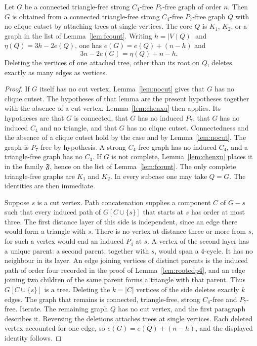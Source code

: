 \documentclass[ASNA]{USG}
\theoremstyle{WBstyletwo}
\numberwithin{equation}{section}
\begin{document}
\begin{lemma}\label{lem:strip}
Let $G$ be a connected triangle-free strong $C_4$-free $P_7$-free graph of order $n$. Then $G$ is obtained from a connected triangle-free strong $C_4$-free $P_7$-free graph $Q$ with no clique cutset by attaching trees at single vertices. The core $Q$ is $K_1$, $K_2$, or a graph in the list of Lemma~\ref{lem:fcount}. Writing $h=|V(Q)|$ and $\eta(Q)=3h-2e(Q)$, one has $e(G)=e(Q)+(n-h)$ and
\[
3n-2e(G)=\eta(Q)+n-h.
\]
Deleting the vertices of one attached tree, other than its root on $Q$, deletes exactly as many edges as vertices.
\end{lemma}

\begin{proof}
If $G$ itself has no cut vertex, Lemma~\ref{lem:nocut} gives that $G$ has no clique cutset. The hypotheses of that lemma are the present hypotheses together with the absence of a cut vertex. Lemma~\ref{lem:chenxu} then applies. Its hypotheses are that $G$ is connected, that $G$ has no induced $P_7$, that $G$ has no induced $C_4$ and no triangle, and that $G$ has no clique cutset. Connectedness and the absence of a clique cutset hold by the case and by Lemma~\ref{lem:nocut}. The graph is $P_7$-free by hypothesis. A strong $C_4$-free graph has no induced $C_4$, and a triangle-free graph has no $C_3$. If $G$ is not complete, Lemma~\ref{lem:chenxu} places it in the family $\mathfrak F$, hence on the list of Lemma~\ref{lem:fcount}. The only complete triangle-free graphs are $K_1$ and $K_2$. In every subcase one may take $Q=G$. The identities are then immediate.

Suppose $s$ is a cut vertex. Path concatenation supplies a component $C$ of $G-s$ such that every induced path of $G[C\cup\{s\}]$ that starts at $s$ has order at most three. The first distance layer of this side is independent, since an edge there would form a triangle with $s$. There is no vertex at distance three or more from $s$, for such a vertex would end an induced $P_4$ at $s$. A vertex of the second layer has a unique parent: a second parent, together with $s$, would span a $4$-cycle. It has no neighbour in its layer. An edge joining vertices of distinct parents is the induced path of order four recorded in the proof of Lemma~\ref{lem:rootedp4}, and an edge joining two children of the same parent forms a triangle with that parent. Thus $G[C\cup\{s\}]$ is a tree. Deleting the $k=|C|$ vertices of the side deletes exactly $k$ edges. The graph that remains is connected, triangle-free, strong $C_4$-free and $P_7$-free. Iterate. The remaining graph $Q$ has no cut vertex, and the first paragraph describes it. Reversing the deletions attaches trees at single vertices. Each deleted vertex accounted for one edge, so $e(G)=e(Q)+(n-h)$, and the displayed identity follows.
\end{proof}
\end{document}
